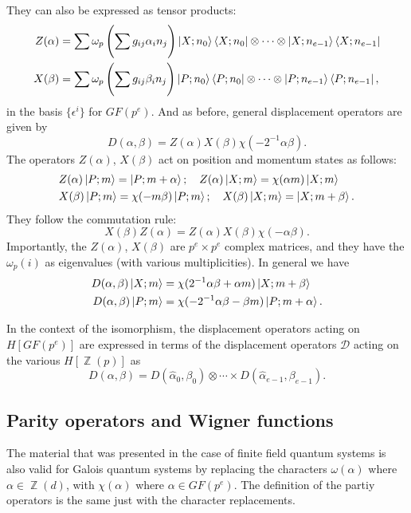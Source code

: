 \documentclass[a4paper]{article}
\DeclareMathOperator{\Z}{\mathbb{Z}}
\begin{document}
  They can also be expressed as tensor products:
  \begin{align*}
    Z(\alpha)
    &= \sum_{}^{} \omega_p\left( \sum_{}^{} g_{ij} \alpha_i
    n_j\right) \ket{X; n_0} \bra{X; n_0} \otimes \cdots
    \otimes \ket{X; n_{e-1}} \bra{X; n_{e-1}} \\
    X(\beta)
    &= \sum_{}^{} \omega_p\left( \sum_{}^{} g_{ij} \beta_i
    n_j \right) \ket{P; n_0} \bra{P; n_0} \otimes \cdots
    \otimes \ket{P; n_{e-1}} \bra{P; n_{e-1}},
  \end{align*}
  in the basis $\{\epsilon^{i}\}$ for $GF(p^{e})$. And as
  before, general displacement operators are given by
  \[
    D(\alpha,\beta)
    = Z(\alpha) X(\beta) \chi(-2^{-1}\alpha\beta).
  \] 
  The operators $Z(\alpha)$, $X(\beta)$ act on position and
  momentum states as follows:
  \begin{align*}
    &Z(\alpha) \ket{P; m} = \ket{P; m+\alpha}; 
    \quad
    Z(\alpha) \ket{X; m} = \chi(\alpha m) \ket{X; m} \\
    &X(\beta) \ket{P; m} = \chi(-m \beta) \ket{P; m};
    \quad
    X(\beta) \ket{X; m} = \ket{X; m+\beta}.
  \end{align*}
  They follow the commutation rule:
  \[
    X(\beta) Z(\alpha) = Z(\alpha) X(\beta) \chi(-\alpha
    \beta).
  \] 
  Importantly, the $Z(\alpha)$, $X(\beta)$ are $p^{e} \times
  p^{e}$ complex matrices, and they have the $\omega_p(i)$ 
  as eigenvalues (with various multiplicities). In general
  we have
  \begin{align*}
    D(\alpha,\beta) \ket{X; m}
    &= \chi(2^{-1} \alpha \beta + \alpha m) \ket{X; m+\beta}
    \\
    D(\alpha,\beta) \ket{P; m}
    &= \chi(-2^{-1} \alpha\beta - \beta m) \ket{P;
    m+\alpha}.
  \end{align*}

  In the context of the isomorphism, the displacement
  operators acting on $H[GF(p^{e})]$ are expressed in terms
  of the displacement operators $\mathcal{D}$ acting on the
  various $H[\Z(p)]$ as
  \[
    D(\alpha,\beta)
    = D(\hat \alpha_0, \beta_0) \otimes \cdots \times D(\hat
    \alpha_{e-1},\beta_{e-1}).
  \] 

  \subsection{Parity operators and Wigner functions}

  The material that was presented in the case of finite
  field quantum systems is also valid for Galois quantum
  systems by replacing the characters $\omega(\alpha)$ where
  $\alpha \in \Z(d)$, with $\chi(\alpha)$ where $\alpha \in
  GF(p^{e})$. The definition of the partiy operators is the
  same just with the character replacements.
\end{document}
